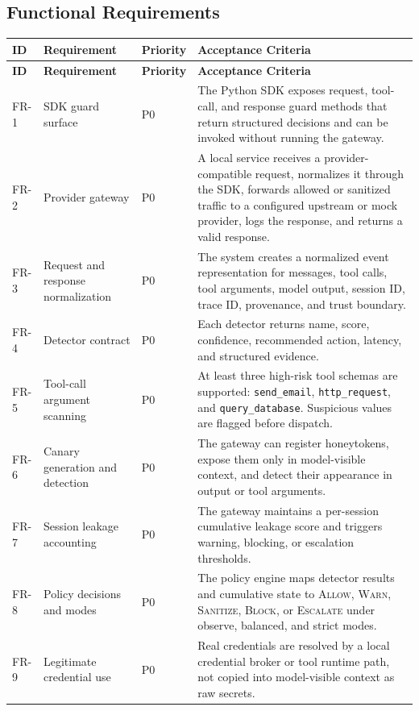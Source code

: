 \documentclass[11pt,letterpaper]{article}
\newcommand{\actionallow}{\textsc{Allow}}
\newcommand{\actionwarn}{\textsc{Warn}}
\newcommand{\actionsanitize}{\textsc{Sanitize}}
\newcommand{\actionblock}{\textsc{Block}}
\newcommand{\actionescalate}{\textsc{Escalate}}
\begin{document}
\subsection{Functional Requirements}

\begin{longtable}{p{}p{}p{}p{}}
\toprule
\textbf{ID} & \textbf{Requirement} & \textbf{Priority} & \textbf{Acceptance Criteria} \\
\midrule
\endfirsthead
\toprule
\textbf{ID} & \textbf{Requirement} & \textbf{Priority} & \textbf{Acceptance Criteria} \\
\midrule
\endhead
FR-1 & SDK guard surface & P0 & The Python SDK exposes request, tool-call, and response guard methods that return structured decisions and can be invoked without running the gateway. \\
FR-2 & Provider gateway & P0 & A local service receives a provider-compatible request, normalizes it through the SDK, forwards allowed or sanitized traffic to a configured upstream or mock provider, logs the response, and returns a valid response. \\
FR-3 & Request and response normalization & P0 & The system creates a normalized event representation for messages, tool calls, tool arguments, model output, session ID, trace ID, provenance, and trust boundary. \\
FR-4 & Detector contract & P0 & Each detector returns name, score, confidence, recommended action, latency, and structured evidence. \\
FR-5 & Tool-call argument scanning & P0 & At least three high-risk tool schemas are supported: \texttt{send\_email}, \texttt{http\_request}, and \texttt{query\_database}. Suspicious values are flagged before dispatch. \\
FR-6 & Canary generation and detection & P0 & The gateway can register honeytokens, expose them only in model-visible context, and detect their appearance in output or tool arguments. \\
FR-7 & Session leakage accounting & P0 & The gateway maintains a per-session cumulative leakage score and triggers warning, blocking, or escalation thresholds. \\
FR-8 & Policy decisions and modes & P0 & The policy engine maps detector results and cumulative state to \actionallow, \actionwarn, \actionsanitize, \actionblock, or \actionescalate{} under observe, balanced, and strict modes. \\
FR-9 & Legitimate credential use & P0 & Real credentials are resolved by a local credential broker or tool runtime path, not copied into model-visible context as raw secrets. \\

\end{longtable}
\end{document}
